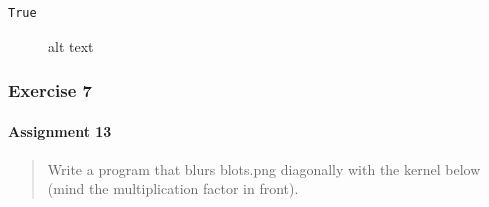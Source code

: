 \documentclass[11pt]{article}
\makeatletter
\newcommand{\boxspacing}{\kern\kvtcb@left@rule\kern\kvtcb@boxsep}
\newcommand{\prompt}[4]{
        {\ttfamily\llap{{\color{#2}[#3]:\hspace{3pt}#4}}\vspace{-\baselineskip}}
    }
\makeatother
\begin{document}
            \begin{tcolorbox}[breakable, size=fbox, boxrule=.5pt, pad at break*=1mm, opacityfill=0]
\prompt{Out}{outcolor}{14}{\boxspacing}
\begin{Verbatim}[commandchars=\\\{\}]
True
\end{Verbatim}
\end{tcolorbox}
        
    \begin{figure}
\centering
{}
\caption{alt text}
\end{figure}

    \subsubsection{Exercise 7}\label{exercise-7}

\paragraph{Assignment 13}\label{assignment-13}

\begin{quote}
Write a program that blurs blots.png diagonally with the kernel below
(mind the multiplication factor in front).
\end{quote}
\end{document}
